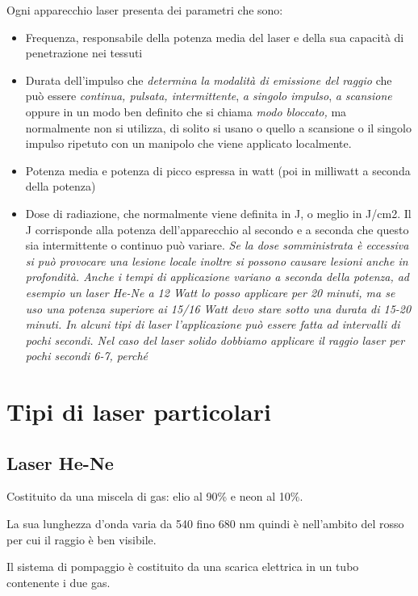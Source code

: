 Ogni apparecchio laser presenta dei parametri che sono:

\begin{itemize}
\item
  Frequenza, responsabile della potenza media del laser e della sua
  capacità di penetrazione nei tessuti
\item
  Durata dell'impulso che \emph{determina la modalità di emissione del
  raggio} che può essere \emph{continua, pulsata, intermittente},
  \emph{a singolo impulso}, \emph{a scansione} oppure in un modo ben
  definito che si chiama \emph{modo bloccato,} ma normalmente non si
  utilizza, di solito si usano o quello a scansione o il singolo impulso
  ripetuto con un manipolo che viene applicato localmente.
\item
  Potenza media e potenza di picco espressa in watt (poi in milliwatt a
  seconda della potenza)
\item

  Dose di radiazione, che normalmente viene definita in J, o meglio in
  J/cm2. Il J corrisponde alla potenza dell'apparecchio al secondo e a
  seconda che questo sia intermittente o continuo può variare. \emph{Se
  la dose somministrata è eccessiva si può provocare una lesione locale
  inoltre si possono causare lesioni anche in profondità. Anche i tempi
  di applicazione variano a seconda della potenza, ad esempio un laser
  He-Ne a 12 Watt lo posso applicare per 20 minuti, ma se uso una
  potenza superiore ai 15/16 Watt devo stare sotto una durata di 15-20
  minuti. In alcuni tipi di laser l'applicazione può essere fatta ad
  intervalli di pochi secondi. Nel caso del laser solido dobbiamo
  applicare il raggio laser per pochi secondi 6-7, perché }
\end{itemize}

\section{Tipi di laser particolari}

\subsection{Laser He-Ne}

Costituito da una miscela di gas: elio al 90\% e neon al 10\%.

La sua lunghezza d'onda varia da 540 fino 680 nm quindi è nell'ambito
del rosso per cui il raggio è ben visibile.

Il sistema di pompaggio è costituito da una scarica elettrica in un tubo
contenente i due gas.


